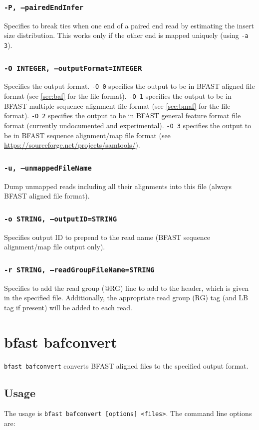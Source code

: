 \documentclass[a4paper,12pt]{book}
\newcommand{\TT}[1]{{\tt #1}} %
\newcommand{\BAF}{BFAST aligned file} %
\newcommand{\BMAF}{BFAST multiple sequence alignment file} %
\newcommand{\BGFFF}{BFAST general feature format file} %
\newcommand{\BSAMF}{BFAST sequence alignment/map file} %
\begin{document}
\subsubsection{\TT{-P, --pairedEndInfer}}
Specifies to break ties when one end of a paired end read by estimating the insert size distribution.  
This works only if the other end is mapped uniquely (using \TT{-a 3}).
\subsubsection{\TT{-O INTEGER, --outputFormat=INTEGER}}
Specifies the output format.
\TT{-O 0} specifies the output to be in \BAF{} format (see \autoref{sec:baf} for the file format).
\TT{-O 1} specifies the output to be in \BMAF{} format (see \autoref{sec:bmaf} for the file format).
\TT{-O 2} specifies the output to be in \BGFFF{} format (currently undocumented and experimental).
\TT{-O 3} specifies the output to be in \BSAMF{} format (see \url{https://sourceforge.net/projects/samtools/}).

\subsubsection{\TT{-u, --unmappedFileName}}
Dump unmapped reads including all their alignments into this file (always \BAF{} format).
\subsubsection{\TT{-o STRING, --outputID=STRING}}
Specifies output ID to prepend to the read name (\BSAMF{} output only).
\subsubsection{\TT{-r STRING, --readGroupFileName=STRING}}
Specifies to add the read group (@RG) line to add to the header, which is given in the specified file.
Additionally, the appropriate read group (RG) tag (and LB tag if present) will be added to each read.
\section{bfast bafconvert}
\label{sec:bafconvert}
\TT{bfast bafconvert} converts \BAF{s} to the specified output format.
\subsection{Usage}
The usage is \TT{bfast bafconvert [options] <files>}.
The command line options are:
\end{document}
